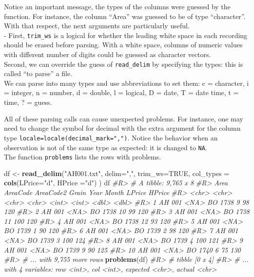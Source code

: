 \documentclass[]{book}
\newenvironment{Shaded}{}{}
\newcommand{\CommentTok}[1]{\textcolor[rgb]{0.38,0.63,0.69}{\textit{#1}}}
\newcommand{\DataTypeTok}[1]{\textcolor[rgb]{0.56,0.13,0.00}{#1}}
\newcommand{\KeywordTok}[1]{\textcolor[rgb]{0.00,0.44,0.13}{\textbf{#1}}}
\newcommand{\NormalTok}[1]{#1}
\newcommand{\OtherTok}[1]{\textcolor[rgb]{0.00,0.44,0.13}{#1}}
\newcommand{\StringTok}[1]{\textcolor[rgb]{0.25,0.44,0.63}{#1}}
\theoremstyle{definition}
\theoremstyle{definition}
\theoremstyle{definition}
\theoremstyle{remark}
\begin{document}
Notice an important message, the types of the columns were guessed by
the function. For instance, the column ``Area'' was guessed to be of
type ``character''. With that respect, the next arguments are
particularly useful.\\
- First, \texttt{trim\_ws} is a logical for whether the leading white
space in each recording should be erased before parsing. With a white
space, columns of numeric values with different number of digits could
be guessed as character vectors.\\
Second, we can override the guess of \texttt{read\_delim} by specifying
the types: this is called ``to parse'' a file.\\
We can parse into many types and use abbreviations to set them: c =
character, i = integer, n = number, d = double, l = logical, D = date, T
= date time, t = time, ? = guess.

All of these parsing calls can cause unexpected problems. For instance,
one may need to change the symbol for decimal with the extra argument
for the column type \texttt{locale=locale(decimal\_mark=",")}. Notice
the behavior when an observation is not of the same type as expected: it
is changed to \texttt{NA}.\\
The function \texttt{problems} lists the rows with problems.

\begin{Shaded}
\begin{Highlighting}[]
\NormalTok{df <-}\StringTok{ }\KeywordTok{read_delim}\NormalTok{(}\StringTok{"AH001.txt"}\NormalTok{, }\DataTypeTok{delim=}\StringTok{","}\NormalTok{, }\DataTypeTok{trim_ws=}\OtherTok{TRUE}\NormalTok{,}
                \DataTypeTok{col_types =} \KeywordTok{cols}\NormalTok{(}\DataTypeTok{LPrice=}\StringTok{"d"}\NormalTok{, }\DataTypeTok{HPrice =}\StringTok{"d"}\NormalTok{) )}
\NormalTok{df}
\CommentTok{#R> # A tibble: 9,765 x 8}
\CommentTok{#R>    Area  AreaCode AreaCode2 Grain  Year Month LPrice HPrice}
\CommentTok{#R>    <chr> <chr>    <chr>     <chr> <int> <int>  <dbl>  <dbl>}
\CommentTok{#R>  1 AH    001      <NA>      BO     1738     9     98    120}
\CommentTok{#R>  2 AH    001      <NA>      BO     1738    10     99    120}
\CommentTok{#R>  3 AH    001      <NA>      BO     1738    11    100    120}
\CommentTok{#R>  4 AH    001      <NA>      BO     1738    12     93    120}
\CommentTok{#R>  5 AH    001      <NA>      BO     1739     1     90    120}
\CommentTok{#R>  6 AH    001      <NA>      BO     1739     2     98    120}
\CommentTok{#R>  7 AH    001      <NA>      BO     1739     3    100    124}
\CommentTok{#R>  8 AH    001      <NA>      BO     1739     4    100    121}
\CommentTok{#R>  9 AH    001      <NA>      BO     1739     9     90    125}
\CommentTok{#R> 10 AH    001      <NA>      BO     1740     6     75    130}
\CommentTok{#R> # ... with 9,755 more rows}
\KeywordTok{problems}\NormalTok{(df)}
\CommentTok{#R> # tibble [0 x 4]}
\CommentTok{#R> # ... with 4 variables: row <int>, col <int>, expected <chr>, actual <chr>}
\end{Highlighting}
\end{Shaded}
\end{document}

